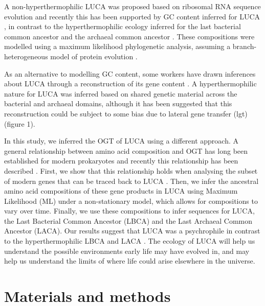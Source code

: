 A non-hyperthermophilic LUCA was proposed based on ribosomal RNA sequence evolution \cite{galtier1999nonhyperthermophilic} and recently this has been supported by GC content inferred for LUCA \cite{boussau2008parallel}, in contrast to the hyperthermophilic ecology inferred for the last bacterial common ancestor and the archaeal common ancestor \cite{groussin2013molecular}. These compositions were modelled using a maximum likelihood phylogenetic analysis, assuming a branch-heterogeneous model of protein evolution \cite{groussin2013branch}. 

As an alternative to modelling GC content, some workers have drawn inferences about LUCA through a reconstruction of its gene content \cite{weiss2016}. A hyperthermophilic nature for LUCA was inferred based on shared genetic material across the bacterial and archaeal domains, although it has been suggested that this reconstruction could be subject to some bias due to lateral gene transfer (\gls{lgt}) \cite{gogarten2016luca} (figure 1).

In this study, we inferred the OGT of LUCA using a different approach. A general relationship between amino acid composition and OGT has long been established for modern prokaryotes \cite{saunders2003mechanisms,kreil2001identification} and recently this relationship has been described \cite{zeldovich2007}. First, we show that this relationship holds when analysing the subset of modern genes that can be traced back to LUCA \cite{weiss2016}. Then, we infer the ancestral amino acid \gls{compositions} of these gene products in LUCA using Maximum Likelihood (ML) under a non-stationary model, which allows for compositions to vary over time. Finally, we use these compositions to infer sequences for LUCA, the Last Bacterial Common Ancestor (\gls{LBCA}) and the Last Archaeal Common Ancestor (\gls{LACA}). Our results suggest that LUCA was a psychrophile in contrast to the hyperthermophilic LBCA and LACA \cite{schwartzman2004hyperthermophilic}. The ecology of LUCA will help us understand the possible environments early life may have evolved in, and may help us understand the limits of where life could arise elsewhere in the universe.

\section{Materials and methods}

 
